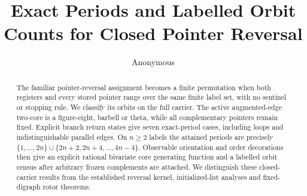 \documentclass[11pt]{article}
\title{Exact Periods and Labelled Orbit Counts for Closed Pointer Reversal}
\author{Anonymous}
\date{}
\begin{document}
\maketitle
\begin{abstract}
The familiar pointer-reversal assignment becomes a finite permutation when
both registers and every stored pointer range over the same finite label set,
with no sentinel or stopping rule. We classify its orbits on the full carrier.
The active augmented-edge two-core is a figure-eight, barbell or theta, while
all complementary pointers remain fixed. Explicit branch return states give
seven exact-period cases, including loops and indistinguishable parallel
edges. On $n\ge2$ labels the attained periods are precisely
$\{1,\ldots,2n\}\cup\{2n+2,2n+4,\ldots,4n-4\}$.
Observable orientation and order decorations then give an explicit rational
bivariate core generating function and a labelled orbit census after arbitrary
frozen complements are attached. We distinguish these closed-carrier results
from the established reversal kernel, initialized-list analyses and
fixed-digraph rotor theorems.
\end{abstract}







\end{document}

